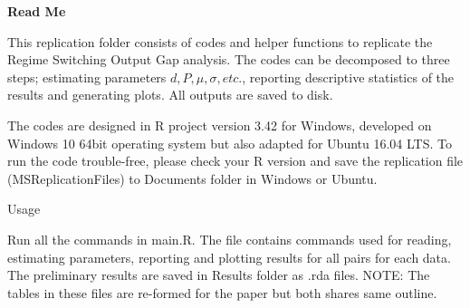 \documentclass{article}
\begin{document}
\begin{center}
	\Large \bf Read Me 
\end{center}
This replication folder consists of codes and helper functions to replicate the Regime Switching Output Gap analysis. The codes can be decomposed to three steps; estimating parameters $ d,P,\mu,\sigma, etc. $, reporting descriptive statistics of the results and generating plots. All outputs are saved to disk.

The codes are designed in R project version 3.42 for Windows, developed on Windows 10 64bit operating system but also adapted for Ubuntu 16.04 LTS. To run the code trouble-free, please check your R version and save the replication file (MSReplicationFiles) to Documents folder in Windows or Ubuntu.
\sloppy
\begin{flushleft}
	\large Usage
\end{flushleft}
Run all the commands in main.R. The file contains commands used for reading, estimating parameters, reporting and plotting results for all pairs for each data. The preliminary results are saved in Results folder as .rda files. NOTE: The tables in these files are re-formed for the paper but both shares same outline.
\end{document}
